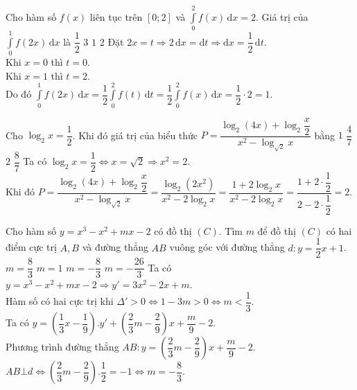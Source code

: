 \begin{ex}%
	Cho hàm số $f(x)$ liên tục trên $[0;2]$ và $\displaystyle \int\limits_0^2 f(x) \mathrm{\, d}x = 2$. Giá trị của $\displaystyle \int\limits_0^1 f(2x) \mathrm{\, d}x$ là
	\choice
	{$\dfrac{1}{2}$}
	{$3$}
	{\True $1$}
	{$2$}
	\loigiai
	{
		Đặt $2x = t \Rightarrow 2\mathrm{\,d}x = \mathrm{d}t \Rightarrow \mathrm{d}x = \dfrac{1}{2}\mathrm{\,d}t$.\\
		Khi $x = 0$ thì $t = 0$.\\
		Khi $x = 1$ thì $t = 2$. \\
		Do đó $\displaystyle \int\limits_0^1 f(2x) \mathrm{\,d}x = \dfrac{1}{2} \displaystyle \int \limits_0^2 f(t) \mathrm{\, d}t = \dfrac{1}{2} \displaystyle \int \limits_0^2 f(x) \mathrm{\, d}x = \dfrac{1}{2} \cdot 2 = 1.$
	}
\end{ex}
\begin{ex}%
	Cho $\log_2x = \dfrac{1}{2}$. Khi đó giá trị của biểu thức $P = \dfrac{\log_2{(4x)} + \log_2 \dfrac{x}{2}}{x^2 - \log_{\sqrt{2}}x}$ bằng
	\choice
	{$1$}
	{$\dfrac{4}{7}$}
	{\True $2$}
	{$\dfrac{8}{7}$}
	\loigiai
	{
		Ta có $\log_2x = \dfrac{1}{2} \Leftrightarrow x = \sqrt{2} \Rightarrow x^2 = 2$. \\ Khi đó
		$P=\dfrac{\log_2(4x)+\log_2\dfrac{x}{2}}{x^2-\log_{\sqrt{2}}x}=\dfrac{\log_2\left(2x^2\right)}{x^2-2\log_2x}=\dfrac{1+2\log_2x}{x^2-2\log_2x}=\dfrac{1+2\cdot \dfrac{1}{2}}{2-2\cdot \dfrac{1}{2}}=2.$
	}
\end{ex}
\begin{ex}%
	Cho hàm số $y=x^3-x^2+mx-2$ có đồ thị $(C)$. Tìm $m$ để đồ thị $(C)$ có hai điểm cực trị $A,B$ và đường thẳng $AB$ vuông góc với đường thẳng $d:y=\dfrac{1}{2}x+1$.
	\choice
	{$m=\dfrac{8}{3}$}
	{$m=1$}
	{\True $m=-\dfrac{8}{3}$}
	{ $m=-\dfrac{26}{3}$}
	\loigiai
	{
		Ta có $y=x^3-x^2+mx-2\Rightarrow y'=3x^2-2x+m$.\\
		Hàm số có hai cực trị khi $\Delta'>0\Leftrightarrow 1-3m>0\Leftrightarrow m <\dfrac{1}{3}$.\\
		Ta có $y=\left(\dfrac{1}{3}x-\dfrac{1}{9}\right).y'+\left(\dfrac{2}{3}m-\dfrac{2}{9}\right)x+\dfrac{m}{9}-2$.\\
		Phương trình đường thẳng $AB:y=\left(\dfrac{2}{3}m-\dfrac{2}{9}\right)x+\dfrac{m}{9}-2$.\\
		$AB\bot d\Leftrightarrow \left(\dfrac{2}{3}m-\dfrac{2}{9}\right).\dfrac{1}{2}=-1\Leftrightarrow m=-\dfrac{8}{3}$.
	}
\end{ex}
